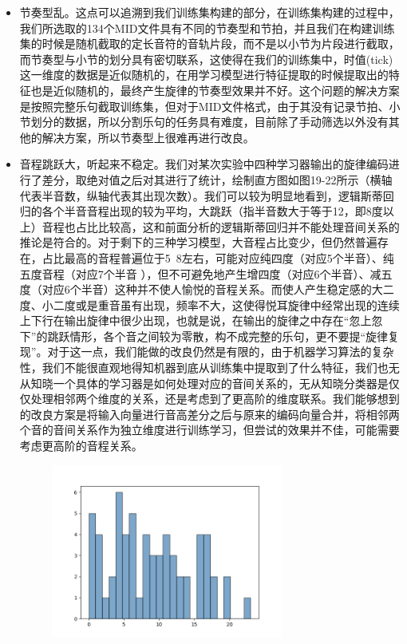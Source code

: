 \documentclass[UTF8,a4paper,10pt]{ctexart}
\begin{document}
    \begin{itemize}
        \item 节奏型乱。这点可以追溯到我们训练集构建的部分，在训练集构建的过程中，我们所选取的134个MID文件具有不同的节奏型和节拍，并且我们在构建训练集的时候是随机截取的定长音符的音轨片段，而不是以小节为片段进行截取，而节奏型与小节的划分具有密切联系，这使得在我们的训练集中，时值(tick)这一维度的数据是近似随机的，在用学习模型进行特征提取的时候提取出的特征也是近似随机的，最终产生旋律的节奏型效果并不好。这个问题的解决方案是按照完整乐句截取训练集，但对于MID文件格式，由于其没有记录节拍、小节划分的数据，所以分割乐句的任务具有难度，目前除了手动筛选以外没有其他的解决方案，所以节奏型上很难再进行改良。
        \item 音程跳跃大，听起来不稳定。我们对某次实验中四种学习器输出的旋律编码进行了差分，取绝对值之后对其进行了统计，绘制直方图如图19-22所示（横轴代表半音数，纵轴代表其出现次数）。我们可以较为明显地看到，逻辑斯蒂回归的各个半音音程出现的较为平均，大跳跃（指半音数大于等于12，即8度以上）音程也占比比较高，这和前面分析的逻辑斯蒂回归并不能处理音间关系的推论是符合的。对于剩下的三种学习模型，大音程占比变少，但仍然普遍存在，占比最高的音程普遍位于5~8左右，可能对应纯四度（对应5个半音）、纯五度音程（对应7个半音 ），但不可避免地产生增四度（对应6个半音）、减五度（对应6个半音）这种并不使人愉悦的音程关系。而使人产生稳定感的大二度、小二度或是重音虽有出现，频率不大，这使得悦耳旋律中经常出现的连续上下行在输出旋律中很少出现，也就是说，在输出的旋律之中存在“忽上忽下”的跳跃情形，各个音之间较为零散，构不成完整的乐句，更不要提“旋律复现”。对于这一点，我们能做的改良仍然是有限的，由于机器学习算法的复杂性，我们不能很直观地得知机器到底从训练集中提取到了什么特征，我们也无从知晓一个具体的学习器是如何处理对应的音间关系的，无从知晓分类器是仅仅处理相邻两个维度的关系，还是考虑到了更高阶的维度联系。我们能够想到的改良方案是将输入向量进行音高差分之后与原来的编码向量合并，将相邻两个音的音间关系作为独立维度进行训练学习，但尝试的效果并不佳，可能需要考虑更高阶的音程关系。
    \begin{figure}[H]
    \begin{minipage}[t]{0.5\linewidth}
    \centering
    \includegraphics[width=3in]{output_logreg_hist.png}

\end{minipage}
\end{figure}
\end{itemize}
\end{document}
